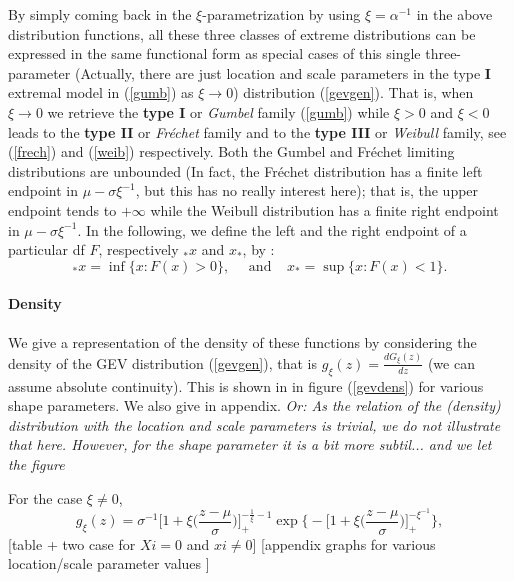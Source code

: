 \documentclass[11pt,a4paper,openany ]{book}
\begin{document}
By simply coming back in the $\xi$-parametrization by using $\xi=\alpha^{-1}$ in the above distribution functions,  all these three classes of extreme distributions can be expressed in the same functional form as special cases of this single three-parameter (Actually, there are just location and scale parameters in the type \textbf{I} extremal model in (\ref{gumb})  as $\xi\to 0$) distribution (\ref{gevgen}).
That is, when $\xi\rightarrow 0$ we retrieve the \textbf{type I} or \emph{Gumbel} family (\ref{gumb}) while $\xi >0$ and $\xi <0$ leads to the \textbf{type II}  or \emph{Fréchet} family and to the \textbf{type III} or \emph{Weibull} family, see (\ref{frech}) and (\ref{weib}) respectively. Both the Gumbel and Fréchet limiting distributions are unbounded (In fact, the Fréchet distribution has a finite left endpoint in $\mu-\sigma\xi^{-1}$, but this has no really interest here); that is, the upper endpoint tends to $+\infty$ while the Weibull distribution has a finite right endpoint in $\mu-\sigma\xi^{-1}$. In the following, we define the left and the right endpoint of a particular df $F$, respectively $_*x$ and $x_*$, by :
\begin{equation*}
_*x=\inf\{x:F(x)>0\}, \ \ \ \ \ \ \text{and} \ \ \ \ \  x_*=\sup\{x:F(x)<1\}.
\end{equation*}



\paragraph{Density}We give a representation of the density of these functions by considering the density of the GEV distribution (\ref{gevgen}), that is $g_{\xi}(z)=\frac{d G_{\xi}(z)}{dz}$ (we can assume absolute continuity). This is shown in in figure (\ref{gevdens}) for various shape parameters. We also give in appendix. \emph{Or: As the relation of the (density) distribution with the location and scale parameters is trivial, we do not illustrate that here. However, for the shape parameter it is a bit more subtil... and we let the figure}

For the case $\xi\neq0$, 
\begin{equation}\label{densgev}
g_{\xi}(z)=\sigma^{-1}\bigg[1+\xi\bigg(\frac{z-\mu}{\sigma}\bigg)\bigg]_+^{-\frac{1}{\xi}-1}\exp\Bigg\{-\bigg[1+\xi\bigg(\frac{z-\mu}{\sigma}\bigg)\bigg]_+^{-\xi^{-1}}\Bigg\},
\end{equation}
[table + two case for $Xi=0$ and $xi\ne 0$]
[appendix graphs for various location/scale parameter values ]
\end{document}
